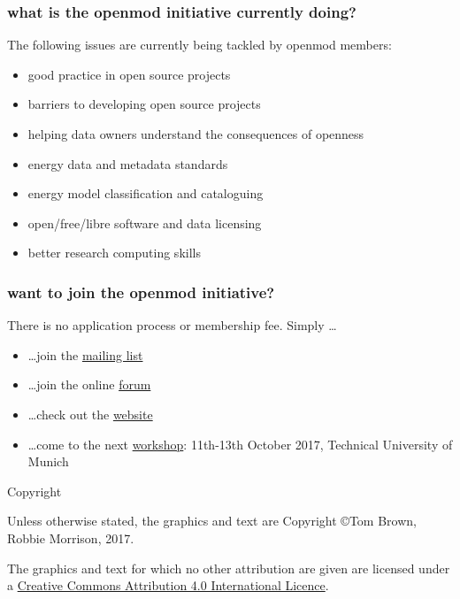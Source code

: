 \documentclass[12pt,aspectratio=169]{beamer}
\let\olditem\item
\renewcommand{\item}{%
\olditem\vspace{5pt}}
\begin{document}
\begin{frame}
  \frametitle{what is the openmod initiative currently doing?}

  The following \alert{issues} are currently being tackled by
  openmod members:
  \begin{itemize}
  \item   good practice in open source projects
  \item barriers to developing open source projects
  \item helping data owners understand the consequences of openness
  \item energy data and metadata standards
  \item energy model classification and cataloguing
  \item open/free/libre software and data licensing
  \item    better research computing skills
  \end{itemize}
\end{frame}

\begin{frame}
  \frametitle{want to join the openmod initiative?}

  There is no application process or membership fee. Simply \dots
  \begin{itemize}
  \item \dots join the \alert{\href{https://groups.google.com/forum/\#!forum/openmod-initiative}{mailing list}}
  \item \dots join the online \alert{\href{https://forum.openmod-initiative.org/}{forum}}
  \item \dots check out the \alert{\href{http://openmod-initiative.org/}{website}}
  \item \dots come to the next \alert{\href{https://wiki.openmod-initiative.org/wiki/Open_Energy_Modelling_Workshop_-_Munich_2017}{workshop}}: 11th-13th October 2017,
    Technical University of Munich
  \end{itemize}

\end{frame}
\begin{frame}{Copyright}


  Unless otherwise stated, the graphics and text are Copyright \copyright Tom Brown, Robbie Morrison, 2017.

  The graphics and text for which no other attribution are given are licensed under a
  \href{http://creativecommons.org/licenses/by/4.0/}{Creative Commons
  Attribution 4.0 International Licence}.

  \begin{center}\ccby\end{center}

\end{frame}
\end{document}
